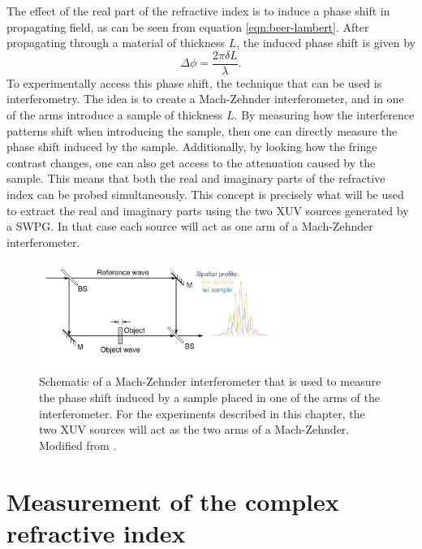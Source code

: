 The effect of the real part of the refractive index is to induce a phase shift in propagating field, as can be seen from equation \ref{eqn:beer-lambert}.  After propagating through a material of thickness $L$, the induced phase shift is given by
\begin{equation}
\label{eqn:phase_shift}
	\Delta\phi=\frac{2\pi\delta L}{\lambda}.
\end{equation}
To experimentally access this phase shift, the technique that can be used is interferometry. The idea is to create a Mach-Zehnder interferometer, and in one of the arms introduce a sample of thickness $L$. By measuring how the interference patterns shift when introducing the sample, then one can directly measure the phase shift induced by the sample.  Additionally, by looking how the fringe contrast changes, one can also get access to the attenuation caused by the sample.  This means that both the real and imaginary parts of the refractive index can be probed simultaneously.  This concept is precisely what will be used to extract the real and imaginary parts using the two XUV sources generated by a SWPG.  In that case each source will act as one arm of a Mach-Zehnder interferometer.
\begin{figure}
	\centering
	\includegraphics[width=0.7\textwidth]{figures/refractive_index/mach_zehnder_phase_shift.png}
	\caption{Schematic of a Mach-Zehnder interferometer that is used to measure the phase shift induced by a sample placed in one of the arms of the interferometer.  For the experiments described in this chapter, the two XUV sources will act as the two arms of a Mach-Zehnder.  Modified from \cite{attwoodSoftXraysExtreme2000}.}
	\label{fig:mach-zehnder_interferometer}
\end{figure}

\section{Measurement of the complex refractive index}
